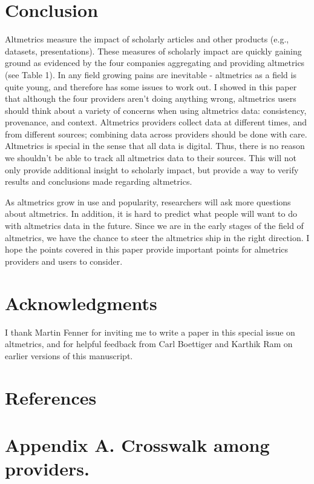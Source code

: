 \documentclass[letterpaper,superscriptaddress,showkeys,longbibliography]{revtex4-1}\usepackage{graphicx, color}
\begin{document}
\section*{Conclusion}

Altmetrics measure the impact of scholarly articles and other products (e.g., datasets, presentations). These measures of scholarly impact are quickly gaining ground as evidenced by the four companies aggregating and providing altmetrics (see Table 1). In any field growing pains are inevitable - altmetrics as a field is quite young, and therefore has some issues to work out. I showed in this paper that although the four providers aren't doing anything wrong, altmetrics users should think about a variety of concerns when using altmetrics data: consistency, provenance, and context. Altmetrics providers collect data at different times, and from different sources; combining data across providers should be done with care. Altmetrics is special in the sense that all data is digital. Thus, there is no reason we shouldn't be able to track all altmetrics data to their sources. This will not only provide additional insight to scholarly impact, but provide a way to verify results and conclusions made regarding altmetrics. 

As altmetrics grow in use and popularity, researchers will ask more questions about altmetrics. In addition, it is hard to predict what people will want to do with altmetrics data in the future. Since we are in the early stages of the field of altmetrics, we have the chance to steer the altmetrics ship in the right direction. I hope the points covered in this paper provide important points for almetrics providers and users to consider. 

\section*{Acknowledgments}

I thank Martin Fenner for inviting me to write a paper in this special issue on altmetrics, and for helpful feedback from Carl Boettiger and Karthik Ram on earlier versions of this manuscript.
  
\section*{References}


\section*{Appendix A. Crosswalk among providers.}
\end{document}
